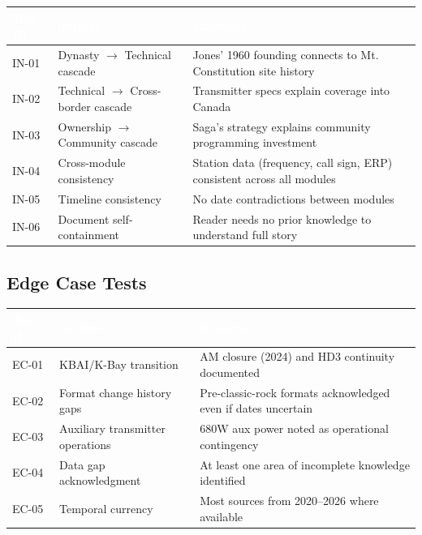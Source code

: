 \documentclass[11pt,letterpaper]{article}
\newcommand{\tableheader}[1]{\textbf{\sffamily\textcolor{white}{#1}}}
\begin{document}
\begin{center}
\begin{tabularx}{\textwidth}{C{1.3cm}L{3.5cm}X}
\toprule
{}
\tableheader{Test ID} & \tableheader{Verifies} & \tableheader{Expected} \\
\midrule
IN-01 & Dynasty $\rightarrow$ Technical cascade & Jones' 1960 founding connects to Mt. Constitution site history \\
IN-02 & Technical $\rightarrow$ Cross-border cascade & Transmitter specs explain coverage into Canada \\
IN-03 & Ownership $\rightarrow$ Community cascade & Saga's strategy explains community programming investment \\
IN-04 & Cross-module consistency & Station data (frequency, call sign, ERP) consistent across all modules \\
IN-05 & Timeline consistency & No date contradictions between modules \\
IN-06 & Document self-containment & Reader needs no prior knowledge to understand full story \\
\bottomrule
\end{tabularx}
\end{center}

\subsection{Edge Case Tests}

\begin{center}
\begin{tabularx}{\textwidth}{C{1.3cm}L{3.5cm}X}
\toprule
{}
\tableheader{Test ID} & \tableheader{Verifies} & \tableheader{Expected} \\
\midrule
EC-01 & KBAI/K-Bay transition & AM closure (2024) and HD3 continuity documented \\
EC-02 & Format change history gaps & Pre-classic-rock formats acknowledged even if dates uncertain \\
EC-03 & Auxiliary transmitter operations & 680W aux power noted as operational contingency \\
EC-04 & Data gap acknowledgment & At least one area of incomplete knowledge identified \\
EC-05 & Temporal currency & Most sources from 2020--2026 where available \\
\bottomrule
\end{tabularx}
\end{center}
\end{document}
